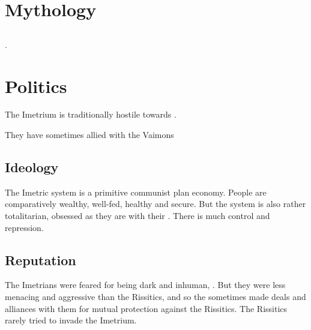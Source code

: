 \section{Mythology}









\subsection{\Ishnaruchaefir}
\Ishnaruchaefir {}.















\section{Politics}
The Imetrium is traditionally hostile towards . 

They have sometimes allied with the  Vaimons





\subsection{Ideology}
The Imetric system is a primitive communist plan economy. 
People are comparatively wealthy, well-fed, healthy and secure. 
But the system is also rather totalitarian, obsessed as they are with their . 
There is much control and repression. 





\subsection{Reputation}
The Imetrians were feared for being dark and inhuman, .
But they were less menacing and aggressive than the Rissitics, and so the \Velcadians sometimes made deals and alliances with them for mutual protection against the Rissitics.
The Rissitics rarely tried to invade the Imetrium.





